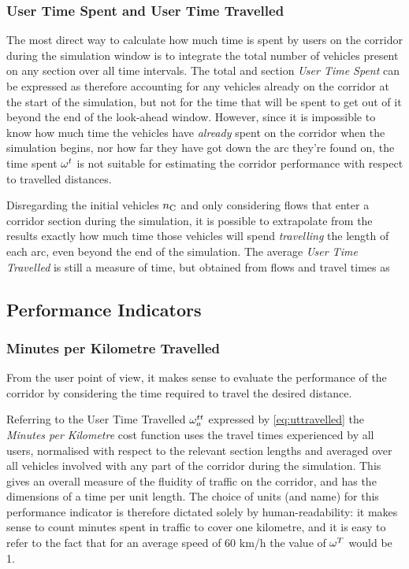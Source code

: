 \subsubsection*{User Time Spent and User Time Travelled}
The most direct way to calculate how much time is spent by users on the corridor during the simulation window is to integrate the total number of vehicles present on any section over all time intervals. The total and section \emph{User Time Spent} can be expressed as
therefore accounting for any vehicles already on the corridor at the start of the simulation, but not for the time that will be spent to get out of it beyond the end of the look-ahead window.
However, since it is impossible to know how much time the vehicles have \emph{already} spent on the corridor when the simulation begins, nor how far they have got down the arc they're found on, the time spent $\omega_{}^{t}$ is not suitable for estimating the corridor performance with respect to travelled distances. 

Disregarding the initial vehicles $n_{\mathrm{C}}$ and only considering flows that enter a corridor section during the simulation, it is possible to extrapolate from the results exactly how much time those vehicles will spend \emph{travelling} the length of each arc, even beyond the end of the simulation. The average \emph{User Time Travelled} is still a measure of time, but obtained from flows and travel times as

\subsection{Performance Indicators}

\subsubsection{Minutes per Kilometre Travelled}
From the user point of view, it makes sense to evaluate the performance of the corridor by considering the time required to travel the desired distance.

Referring to the User Time Travelled $\omega_{a}^{tt}$ expressed by \eqref{eq:uttravelled} the \emph{Minutes per Kilometre} cost function
uses the travel times experienced by all users, normalised with respect to the relevant section lengths and averaged over all vehicles involved with any part of the corridor during the simulation. This gives an overall measure of the fluidity of traffic on the corridor, and has the dimensions of a time per unit length. The choice of units (and name) for this performance indicator is therefore dictated solely by human-readability: it makes sense to count minutes spent in traffic to cover one kilometre, and it is easy to refer to the fact that for an average speed of 60 km/h the value of $\omega_{}^{T}$ would be 1.

